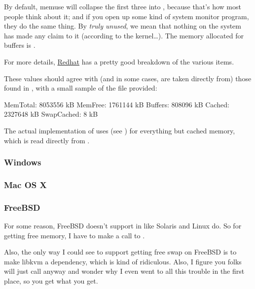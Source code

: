 By default, memuse will collapse the first three into , because that's how most people think about it; and if you open up some kind of system monitor program, they do the same thing.  By \emph{truly unused}, we mean that nothing on the system has made any claim to it (according to the kernel\dots).  The memory allocated for buffers is .

For more details, \href{https://www.redhat.com/advice/tips/meminfo.html}{Redhat} has a pretty good breakdown of the various items.


These values should agree with (and in some cases, are taken directly from) those found in 
, with a small sample of the file provided:

\begin{center}
\begin{minipage}{.4\textwidth}
\begin{Output}
MemTotal:        8053556 kB
MemFree:         1761144 kB
Buffers:          808096 kB
Cached:          2327648 kB
SwapCached:            8 kB
\end{Output}
\end{minipage}
\end{center}

The actual implementation of  uses  (see ) for everything but cached memory, which is read directly from .


\subsubsection{Windows}


\subsubsection{Mac OS X}





\subsubsection{FreeBSD}

For some reason, FreeBSD doesn't support  in  like Solaris and Linux do.  So for getting free memory, I have to make a call to .

Also, the only way I could see to support getting free swap on FreeBSD is to make libkvm a dependency, 
which is kind of ridiculous.  Also, I figure you folks will just call  anyway and 
wonder why I even went to all this trouble in the first place, so you get what you get.



